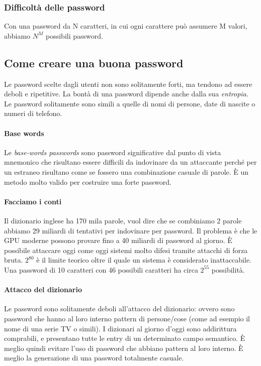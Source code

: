 \subsubsection{Difficoltà delle password}

Con una password da N caratteri, in cui ogni carattere può assumere M valori,
abbiamo $N^M$ possibili password.

\subsection{Come creare una buona password}

Le password scelte dagli utenti non sono solitamente forti, ma tendono ad
essere deboli e ripetitive. La bontà di una password dipende anche dalla sua
\textit{entropia}.
Le password solitamente sono simili a quelle di nomi di persone, date di
nascite o numeri di telefono.

\paragraph*{Base words}
Le \textit{base-words passwords} sono password significative dal punto di vista
mnemonico che risultano essere difficili da indovinare da un attaccante perché
per un estraneo risultano come se fossero una combinazione casuale di parole.
È un metodo molto valido per costruire una forte password.

\paragraph*{Facciamo i conti}

Il dizionario inglese ha 170 mila parole, vuol dire che se combiniamo 2 parole
abbiamo 29 miliardi di tentativi per indovinare per password. Il problema è che
le GPU moderne possono provare fino a 40 miliardi di password al giorno.
È possibile attaccare oggi come oggi sistemi molto difesi tramite attacchi di
forza bruta.
$2^{80}$ è il limite teorico oltre il quale un sistema è considerato
inattaccabile. Una password di 10 caratteri con 46 possibili caratteri ha circa
$2^{55}$ possibilità.

\paragraph*{Attacco del dizionario}
Le password sono solitamente deboli all'attacco del dizionario: ovvero sono
password che hanno al loro interno pattern di persone/cose (come ad esempio il
nome di una serie TV o simili). I dizionari al giorno d'oggi sono addirittura
comprabili, e presentano tutte le entry di un determinato campo semantico.
È meglio quindi evitare l'uso di password che abbiano pattern al loro interno.
È meglio la generazione di una password totalmente casuale.

